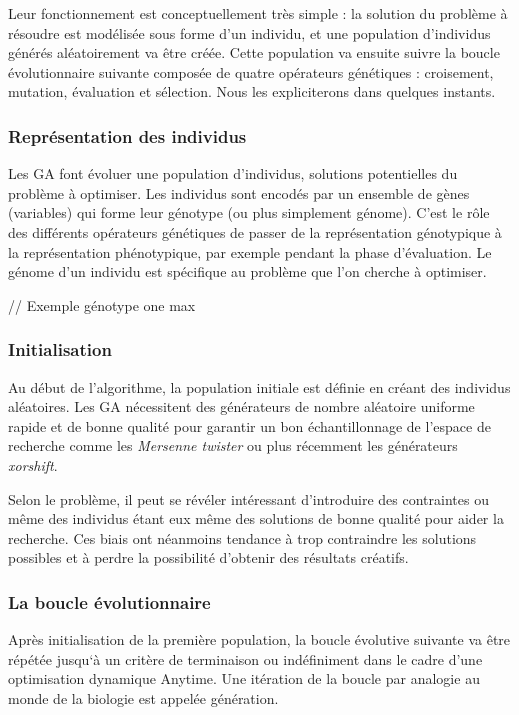 \documentclass[french, 11pt]{memoir}
\begin{document}
\bigskip
Leur fonctionnement est conceptuellement très simple : la solution du
problème à résoudre est modélisée sous forme d'un individu, et une
population d'individus générés aléatoirement va être créée. Cette
population va ensuite suivre la boucle évolutionnaire suivante composée
de quatre opérateurs génétiques : croisement, mutation, évaluation et
sélection. Nous les expliciterons dans quelques instants.

\subsubsection{Représentation des
	individus}\label{repruxe9sentation-des-individus}

Les GA font évoluer une population d'individus, solutions potentielles
du problème à optimiser. Les individus sont encodés par un ensemble de
gènes (variables) qui forme leur génotype (ou plus simplement génome).
C'est le rôle des différents opérateurs génétiques de passer de la
représentation génotypique à la représentation phénotypique, par exemple
pendant la phase d'évaluation. Le génome d'un individu est spécifique au
problème que l'on cherche à optimiser.

// Exemple génotype one max

\subsubsection{Initialisation}\label{initialisation}

Au début de l'algorithme, la population initiale est définie en créant
des individus aléatoires. Les GA nécessitent des générateurs de nombre
aléatoire uniforme rapide et de bonne qualité pour garantir un bon
échantillonnage de l'espace de recherche comme les \emph{Mersenne
	twister} ou plus récemment les générateurs \emph{xorshift}.

\bigskip
Selon le problème, il peut se révéler intéressant d'introduire des
contraintes ou même des individus étant eux même des solutions de bonne
qualité pour aider la recherche. Ces biais ont néanmoins tendance à trop
contraindre les solutions possibles et à perdre la possibilité d'obtenir
des résultats créatifs.

\subsubsection{La boucle
	évolutionnaire}\label{la-boucle-uxe9volutionnaire}

Après initialisation de la première population, la boucle évolutive
suivante va être répétée jusqu`à un critère de terminaison ou
indéfiniment dans le cadre d'une optimisation dynamique Anytime. Une
itération de la boucle par analogie au monde de la biologie est appelée
génération.
\end{document}
